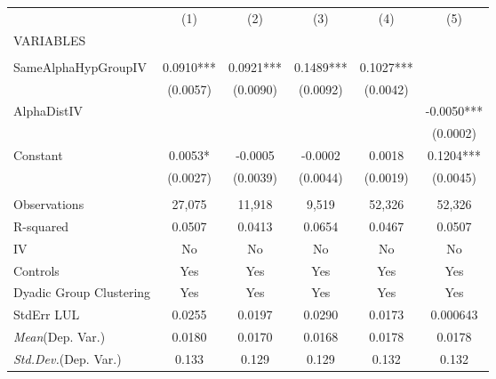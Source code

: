 \documentclass[]{article}
\begin{document}
\begin{tabular}{lccccc} \hline
 & (1) & (2) & (3) & (4) & (5) \\
VARIABLES &  &  &  &  &  \\ \hline
 &  &  &  &  &  \\
SameAlphaHypGroupIV & 0.0910*** & 0.0921*** & 0.1489*** & 0.1027*** &  \\
 & (0.0057) & (0.0090) & (0.0092) & (0.0042) &  \\
AlphaDistIV &  &  &  &  & -0.0050*** \\
 &  &  &  &  & (0.0002) \\
Constant & 0.0053* & -0.0005 & -0.0002 & 0.0018 & 0.1204*** \\
 & (0.0027) & (0.0039) & (0.0044) & (0.0019) & (0.0045) \\
 &  &  &  &  &  \\
Observations & 27,075 & 11,918 & 9,519 & 52,326 & 52,326 \\
R-squared & 0.0507 & 0.0413 & 0.0654 & 0.0467 & 0.0507 \\
IV & No & No & No & No & No \\
Controls & Yes & Yes & Yes & Yes & Yes \\
Dyadic Group Clustering & Yes & Yes & Yes & Yes & Yes \\
StdErr LUL & 0.0255 & 0.0197 & 0.0290 & 0.0173 & 0.000643 \\
\textit{Mean}(Dep. Var.) & 0.0180 & 0.0170 & 0.0168 & 0.0178 & 0.0178 \\
 \textit{Std.Dev.}(Dep. Var.) & 0.133 & 0.129 & 0.129 & 0.132 & 0.132 \\ \hline
\end{tabular}
\end{document}
